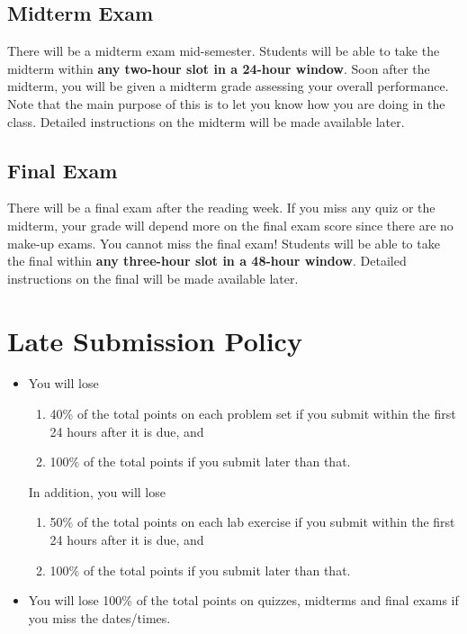 \documentclass[11pt, a4paper]{article}
\begin{document}
\subsection{Midterm Exam}
There will be a midterm exam mid-semester.  Students will be able to take the midterm within \textbf{any two-hour slot in a 24-hour window}.  Soon after the midterm, you will be given a midterm grade assessing your overall performance. Note that the main purpose of this is to let you know how you are doing in the class. Detailed instructions on the midterm will be made available later.

\subsection{Final Exam}
There will be a final exam after the reading week. If you miss any quiz or the midterm, your grade will depend more on the final exam score since there are no make-up exams. You cannot miss the final exam! Students will be able to take the final within \textbf{any three-hour slot in a 48-hour window}. Detailed instructions on the final will be made available later.


\section{Late Submission Policy} 
\begin{itemize}
	\item You will lose
	\begin{enumerate}
		\item 40\% of the total points on each problem set if you submit within the first 24 hours after it is due, and
		\item 100\% of the total points if you submit later than that.
	\end{enumerate}
	
	In addition, you will lose 
	\begin{enumerate}
		\item 50\% of the total points on each lab exercise if you submit within the first 24 hours after it is due, and
		\item 100\% of the total points if you submit later than that.
	\end{enumerate}
	
	\item You will lose 100\% of the total points on quizzes, midterms and final exams if you miss the dates/times.
\end{itemize}
\end{document}
